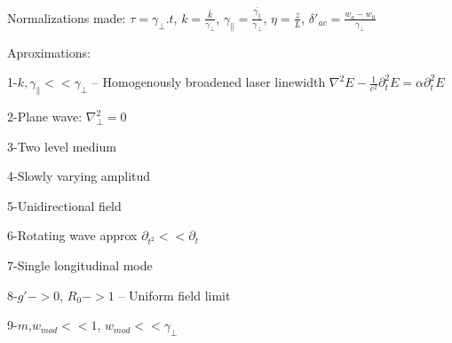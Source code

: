 		Normalizations made: 
		$\tau= \gamma_{\bot}.t$, $k=\tfrac{\bar{k}}{\gamma_{\bot}}$,  $\gamma_{\parallel}=\tfrac{\bar{\gamma_{\parallel}}}{\gamma_{\bot}}$, $\eta=\tfrac{z}{L}$, $\delta'_{ac}=\tfrac{w_a-w_0}{\gamma_{\bot}}$
		
		
		Aproximations: 
		
		1-$k,\gamma_{\parallel}<<\gamma_{\bot}$   -- Homogenously broadened laser linewidth $ \nabla^2 E-\frac{1}{c^2}\partial^2_{t}E=\alpha \partial^2_{t}E$
		
		2-Plane wave: $\nabla^2_{\bot}=0$
		
		3-Two level medium
		
		4-Slowly varying amplitud
		
		5-Unidirectional field
		
		6-Rotating wave approx $\partial_{t^2}<<\partial_t$
		
		7-Single longitudinal mode
		
		8-$g'->0$, $R_0->1$  -- Uniform field limit
		
		9-$m$,$w_{mod}<<1$, $w_{mod}<<\gamma_{\bot}$ %